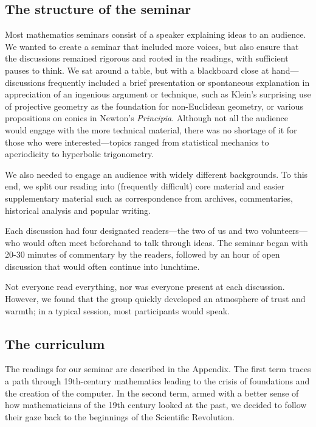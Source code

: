 \documentclass{article}
\begin{document}
  


\subsection{The structure of the seminar}
 Most mathematics seminars consist of a speaker explaining ideas to an audience. We wanted to create a seminar that included more voices, but also ensure that the discussions remained rigorous and rooted in the readings, with sufficient pauses to think. We sat around a table, but with a blackboard close at hand—discussions frequently included a brief presentation or spontaneous explanation in appreciation of an ingenious argument or technique, such as Klein’s surprising use of projective geometry as the foundation for non-Euclidean geometry, or various propositions on conics in Newton’s {\em Principia}. Although not all the audience would engage with the more technical material, there was no shortage of it for those who were interested—topics ranged from statistical mechanics to aperiodicity to hyperbolic trigonometry.
 
We also needed to engage an audience with widely different backgrounds. To this end, we split our reading into (frequently difficult) core material and easier supplementary material such as correspondence from archives, commentaries, historical analysis and popular writing.

Each discussion had four designated readers—the two of us and two volunteers—who would often meet beforehand to talk through ideas. The seminar began with 20-30 minutes of commentary by the readers, followed by an hour of open discussion that would often continue into lunchtime.

Not everyone read everything, nor was everyone present at each discussion. However, we found that the group quickly developed an atmosphere of trust and warmth; in a typical session, most participants would speak.

\subsection{The curriculum}
The readings for our seminar are described in the Appendix. The first term traces a path through 19th-century mathematics leading to the crisis of foundations and the creation of the computer. In the second term, armed with a better sense of how mathematicians of the 19th century looked at the past, we decided to follow their gaze back to the beginnings of the Scientific Revolution.
\end{document}
